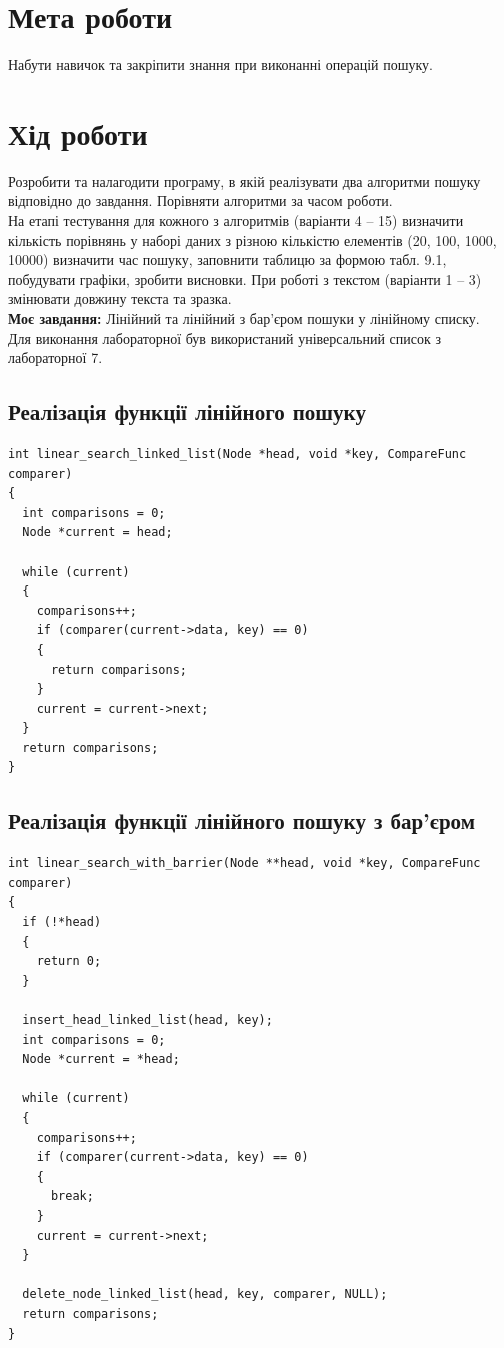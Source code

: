 \section{Мета роботи}
Набути навичок та закріпити знання при виконанні операцій
пошуку.

\section{Хід роботи}
  Розробити та налагодити програму, в якій реалізувати два алгоритми
пошуку відповідно до завдання. Порівняти алгоритми за часом роботи.\\

  На етапі тестування для кожного з алгоритмів (варіанти 4 – 15)
визначити кількість порівнянь у наборі даних з різною кількістю елементів
(20, 100, 1000, 10000) визначити час пошуку, заповнити таблицю за формою
табл. 9.1, побудувати графіки, зробити висновки. При роботі з текстом
(варіанти 1 – 3) змінювати довжину текста та зразка.\\

\textbf{Моє завдання:} Лінійний та лінійний з бар’єром пошуки у лінійному списку.\\

Для виконання лабораторної був використаний універсальний список з лабораторної 7.

\clearpage
\subsection{Реалізація функції лінійного пошуку}
\begin{lstlisting}[style=customc]
int linear_search_linked_list(Node *head, void *key, CompareFunc comparer)
{
  int comparisons = 0;
  Node *current = head;

  while (current)
  {
    comparisons++;
    if (comparer(current->data, key) == 0)
    {
      return comparisons;
    }
    current = current->next;
  }
  return comparisons;
}
\end{lstlisting}


\subsection{Реалізація функції лінійного пошуку з бар’єром}
\begin{lstlisting}[style=customc]
int linear_search_with_barrier(Node **head, void *key, CompareFunc comparer)
{
  if (!*head)
  {
    return 0;
  }

  insert_head_linked_list(head, key);
  int comparisons = 0;
  Node *current = *head;

  while (current)
  {
    comparisons++;
    if (comparer(current->data, key) == 0)
    {
      break;
    }
    current = current->next;
  }

  delete_node_linked_list(head, key, comparer, NULL);
  return comparisons;
}
\end{lstlisting}

